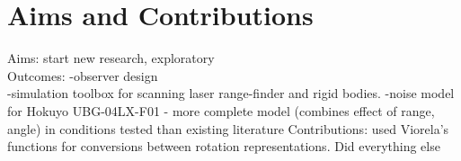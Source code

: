 \chapter*{Aims and Contributions}

Aims: start new research, exploratory\\
Outcomes:
-observer design\\
-simulation toolbox for scanning laser range-finder and rigid bodies.
-noise model for Hokuyo UBG-04LX-F01 - more complete model (combines effect of range, angle) in conditions tested than existing literature
Contributions: used Viorela's functions for conversions between rotation representations. Did everything else